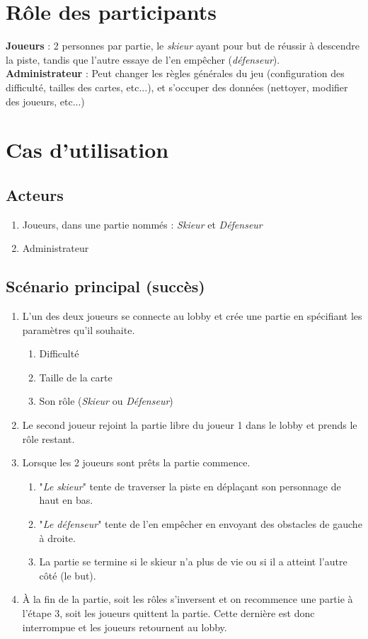\documentclass[a4paper,11pt]{article}
\begin{document}
	\section{Rôle des participants}

		\textbf{Joueurs} : 2 personnes par partie, le \textit{skieur} ayant pour but de réussir à descendre la piste, tandis que l'autre essaye de l'en empêcher (\textit{défenseur}). \\

		\textbf{Administrateur} : Peut changer les règles générales du jeu (configuration des difficulté, tailles des cartes, etc...), et s'occuper des données (nettoyer, modifier des joueurs, etc...)

	\section{Cas d'utilisation}
		\subsection{Acteurs}
		\begin{enumerate}
			\item Joueurs, dans une partie nommés : \textit{Skieur} et \textit{Défenseur}
			\item Administrateur
		\end{enumerate}
		\subsection{Scénario principal (succès)}
		\begin{enumerate}
			\item L'un des deux joueurs se connecte au lobby et crée une partie en spécifiant les paramètres qu'il souhaite.
			\begin{enumerate}
				\item Difficulté
				\item Taille de la carte
				\item Son rôle (\textit{Skieur} ou \textit{Défenseur})
			\end{enumerate}
			\item Le second joueur rejoint la partie libre du joueur 1 dans le lobby et prends le rôle restant.
			\item Lorsque les 2 joueurs sont prêts la partie commence.
			\begin{enumerate}
				\item "\textit{Le skieur}" tente de traverser la piste en déplaçant son personnage de haut en bas.
				\item "\textit{Le défenseur}" tente de l'en empêcher en envoyant des obstacles de gauche à droite.
				\item La partie se termine si le skieur n'a plus de vie ou si il a atteint l'autre côté (le but).
			\end{enumerate}
			\item À la fin de la partie, soit les rôles s'inversent et on recommence une partie à l'étape 3, soit les joueurs quittent la partie. Cette dernière est donc interrompue et les joueurs retournent au lobby.
		\end{enumerate}
\end{document}
